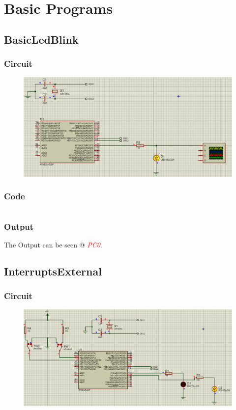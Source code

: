 \documentclass[oneside]{book}
\newcommand{\pinFormat}[1]{\emph{\textcolor{red}{#1}}}
\begin{document}
\tableofcontents

\chapter{Basic Programs}

\section{BasicLedBlink}
\subsection{Circuit}
\begin{figure}[H]
    \centering
    \includegraphics[height=0.2\textheight]{basicLedBlink.png}
\end{figure}
\subsection{Code}
\inputminted[bgcolor=black]{c}{./programFiles/basicLedBlink.c}
\subsection{Output}
\quad The Output can be seen @ \pinFormat{PC0}.


\section{InterruptsExternal}
\subsection{Circuit}
\begin{figure}[H]
    \centering
    \includegraphics[height=0.2\textheight]{InterruptsExternal.png}
\end{figure}
\end{document}
